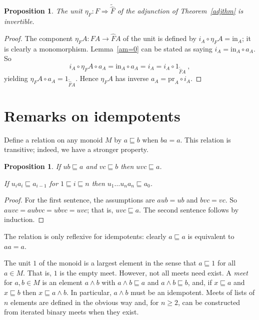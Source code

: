 \documentclass[a4paper,12pt,reqno]{amsart}
\newtheorem{proposition}[theorem]{Proposition}
\theoremstyle{definition}
\theoremstyle{fact}
\theoremstyle{genquest}
\theoremstyle{step}
\newcommand{\ra}{\rightarrow}
\newcommand{\Lra}{\Longrightarrow}
\begin{document}
\begin{proposition}\label{unitinv}
The unit $\eta_F : F \Lra \widetilde{\widehat{F}}$ of the adjunction
of Theorem~\ref{adjthm} is invertible. 
\end{proposition}
\begin{proof}
The component $\eta_FA : FA \ra \widehat{F}A$ of the unit is defined by $i_A\circ \eta_FA = \mathrm{in}_A$;
it is clearly a monomorphism. Lemma~\ref{am=0} can be stated as
saying $i_A = \mathrm{in}_A \circ a_A$. So
$$i_A \circ \eta_FA \circ a_A = \mathrm{in}_A \circ a_A = i_A = i_A \circ 1_{\widetilde{\widehat{F}}A} \ ,$$
yielding $\eta_FA \circ a_A = 1_{\widetilde{\widehat{F}}A}$. Hence $\eta_FA$ has inverse $a_A = \mathrm{pr}_A\circ i_A$.     
\end{proof}

\section{Remarks on idempotents}\label{idemp}

Define a relation on any monoid $M$ by $a\sqsubseteq b$ when $ba = a$.
This relation is transitive; indeed, we have a stronger property.

\begin{proposition}\label{gentrans}
If $ub\sqsubseteq a$ and $vc \sqsubseteq b$ then $uvc\sqsubseteq a$.

If $u_ia_i\sqsubseteq a_{i-1}$ for $1\sqsubseteq i\sqsubseteq n$ then $u_1\dots u_na_n\sqsubseteq a_0$.
\end{proposition}
\begin{proof}
For the first sentence, the assumptions are $aub = ub$ and $bvc=vc$.
So $auvc = aubvc=ubvc=uvc$; that is, $uvc \sqsubseteq a$. 
The second sentence follows by induction.
\end{proof}

The relation is only reflexive for idempotents: clearly $a\sqsubseteq a$ is equivalent to $aa=a$.

The unit $1$ of the monoid is a largest element in the sense that $a\sqsubseteq 1$ for all $a\in M$.
That is, $1$ is the empty meet. 
However, not all meets need exist. A {\em meet} for $a,b\in M$ is an element $a\wedge b$
with $a\wedge b \sqsubseteq a$ and $a\wedge b \sqsubseteq b$, and, if $x\sqsubseteq a$ and $x\sqsubseteq b$ then
$x\sqsubseteq a\wedge b$. In particular, $a\wedge b$ must be an idempotent. 
Meets of lists of $n$ elements are defined in the obvious way and, for $n\ge 2$,
can be constructed from iterated binary meets when they exist. 
\end{document}
